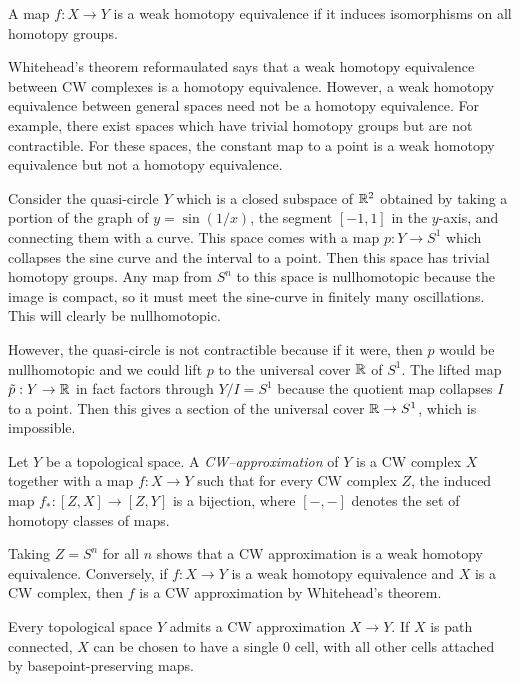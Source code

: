 \documentclass[12pt]{article}
\begin{document}
\begin{definition}
    A map $f: X \to Y$ is a weak homotopy equivalence if it induces isomorphisms on all homotopy groups. 
\end{definition}
Whitehead's theorem reformaulated says that a weak homotopy equivalence between CW complexes is a homotopy equivalence. However, a weak homotopy equivalence between general spaces need not be a homotopy equivalence. For example, there exist spaces which have trivial homotopy groups but are not contractible. For these spaces, the constant map to a point is a weak homotopy equivalence but not a homotopy equivalence.

\begin{example}
    Consider the quasi-circle $Y$ which is a closed subspace of $\mathbb{R}^2$ obtained by taking a portion of the graph of $y = \sin(1/x)$, the segment $[-1,1]$ in the $y$-axis, and connecting them with a curve. This space comes with a map $p: Y \to S^1$ which collapses the sine curve and the interval to a point. Then this space has trivial homotopy groups. Any map from $S^n$ to this space is nullhomotopic because the image is compact, so it must meet the sine-curve in finitely many oscillations. This will clearly be nullhomotopic.  
    
    However, the quasi-circle is not contractible because if it were, then $p$ would be nullhomotopic and we could lift $p$ to the universal cover $\mathbb{R}$ of $S^1$. The lifted map $\tilde p: Y \to \mathbb{R}$ in fact factors through $Y/I = S^1$ because the quotient map collapses $I$ to a point. Then this gives a section of the universal cover $\mathbb{R} \to S^1$, which is impossible.
\end{example}

\begin{definition}
    Let $Y$ be a topological space. A \textit{CW--approximation} of $Y$ is a CW complex $X$ together with a map $f:X\to Y$ such that for every CW complex $Z$, the induced map $f_*:[Z,X]\to [Z,Y]$ is a bijection, where $[-,-]$ denotes the set of homotopy classes of maps.
\end{definition}
Taking $Z = S^n$ for all $n$ shows that a CW approximation is a weak homotopy equivalence. Conversely, if $f:X\to Y$ is a weak homotopy equivalence and $X$ is a CW complex, then $f$ is a CW approximation by Whitehead's theorem. 

\begin{theorem}
    Every topological space $Y$ admits a CW approximation $X\to Y$. If $X$ is path connected, $X$ can be chosen to have a single $0$ cell, with all other cells attached by basepoint-preserving maps. 
\end{theorem}
\end{document}

